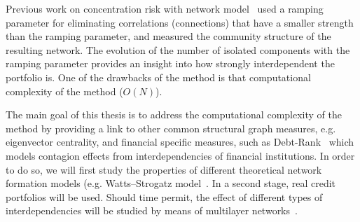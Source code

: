 \documentclass[12pt,beltcrest]{ociamthesis} %
\begin{document}
Previous work on concentration risk with network model~\citep{Sindel:2009vd} used a ramping parameter for eliminating correlations (connections) that have a smaller strength than the ramping parameter, and measured the community structure of the resulting network. The evolution of the number of isolated components with the ramping parameter provides an insight into how strongly interdependent the portfolio is. One of the drawbacks of the method is that computational complexity of the method ($O(N)$).

The main goal of this thesis is to address the computational complexity of the method by providing a link to other common structural graph measures, e.g. eigenvector centrality, and financial specific measures, such as Debt-Rank~\citep{Puliga:2012ev} which models contagion effects from interdependencies of financial institutions.
In order to do so, we will first study the properties of different theoretical network formation models (e.g. Watts–Strogatz model~\citep{Watts:1998db}.
In a second stage, real credit portfolios will be used. Should time permit, the effect of different types of interdependencies will be studied by means of multilayer networks~\citep{Kivela:2014dm}.





\appendix



\end{document}
